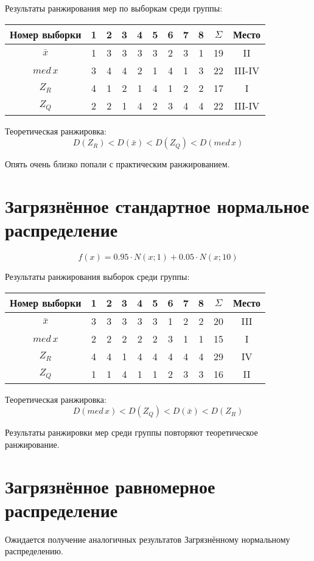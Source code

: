 \documentclass{article} %
\begin{document}
Результаты ранжирования мер по выборкам среди группы:
\begin{center}
	\begin{tabular}{|c| c|c|c|c|c|c|c|c| c|c|} \hline
		Номер выборки & 1 & 2 & 3 & 4 & 5 & 6 & 7 & 8 & \(\Sigma\) & Место \\ \hline
		\(\bar{x}\)   & 1 & 3 & 3 & 3 & 3 & 2 & 3 & 1 & 19 & II \\ \hline
		\(med \, x\)  & 3 & 4 & 4 & 2 & 1 & 4 & 1 & 3 & 22 & III-IV \\ \hline
		\(Z_R\)       & 4 & 1 & 2 & 1 & 4 & 1 & 2 & 2 & 17 & I \\ \hline
		\(Z_Q\)       & 2 & 2 & 1 & 4 & 2 & 3 & 4 & 4 & 22 & III-IV \\ \hline
	\end{tabular}
\end{center}

Теоретическая ранжировка:
\[ D(Z_R) < D(\bar{x}) < D(Z_Q) < D(med \, x) \]

Опять очень близко попали с практическим ранжированием.

\section{Загрязнённое стандартное нормальное распределение}
\[ f(x) = 0.95 \cdot N(x;1) + 0.05 \cdot N(x;10)\]

Результаты ранжирования выборок среди группы:
\begin{center}
	\begin{tabular}{|c| c|c|c|c|c|c|c|c| c|c|} \hline
		Номер выборки & 1 & 2 & 3 & 4 & 5 & 6 & 7 & 8 & \(\Sigma\) & Место \\ \hline
		\(\bar{x}\)   & 3 & 3 & 3 & 3 & 3 & 1 & 2 & 2 & 20 & III \\ \hline
		\(med \, x\)  & 2 & 2 & 2 & 2 & 2 & 3 & 1 & 1 & 15 & I \\ \hline
		\(Z_R\)       & 4 & 4 & 1 & 4 & 4 & 4 & 4 & 4 & 29 & IV \\ \hline
		\(Z_Q\)       & 1 & 1 & 4 & 1 & 1 & 2 & 3 & 3 & 16 & II \\ \hline
	\end{tabular}
\end{center}

Теоретическая ранжировка:
\[ D(med \, x) < D(Z_Q) < D(\bar{x}) < D(Z_R) \]

Результаты ранжировки мер среди группы повторяют теоретическое ранжирование.

\section{Загрязнённое равномерное распределение}
Ожидается получение аналогичных результатов Загрязнённому нормальному распределению.
\end{document}
